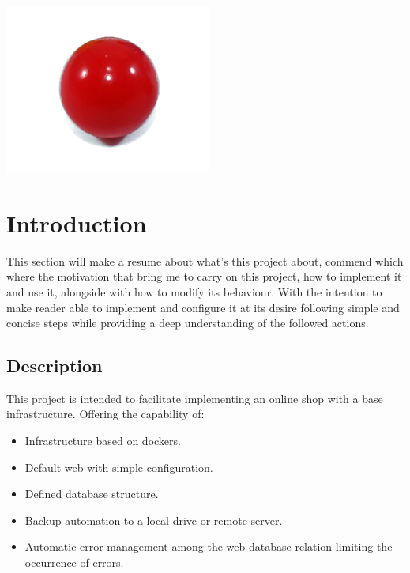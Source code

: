 \documentclass[11pt]{article}
\begin{document}
    \clearpage
    \maketitle
    \includegraphics[scale=1.5]{favicon}
    \thispagestyle{empty}

    \newpage
    \tableofcontents{}
    \thispagestyle{empty}

    \newpage
    \setcounter{page}{1}
    \section{Introduction}\label{sec:introduction}

        This section will make a resume about what's this project about, commend which where the motivation that bring
        me to carry on this project, how to implement it and use it, alongside with how to modify its behaviour.
        With the intention to make reader able to implement and configure it at its desire following simple and
        concise steps while providing a deep understanding of the followed actions.

    \newpage
    \subsection{Description}\label{subsec:Description}

        This project is intended to facilitate implementing an online shop with a base infrastructure.
        Offering the capability of:
        \begin{itemize}
            \item Infrastructure based on dockers.
            \item Default web with simple configuration.
            \item Defined database structure.
            \item Backup automation to a local drive or remote server.
            \item Automatic error management among the web-database relation limiting the occurrence of errors.
        \end{itemize}
\end{document}
